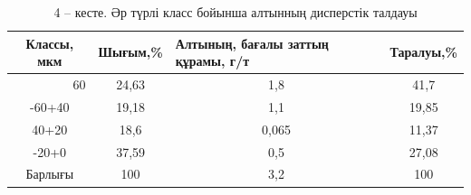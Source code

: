 
\begin{table}[H]
\caption*{4 -- кесте. Әр түрлі класс бойынша алтынның дисперстік талдауы}
\centering
\begin{tabular}{|c|c|c|c|}
\hline
Классы, мкм & \multicolumn{1}{l|}{Шығым,\%} & \multicolumn{1}{l|}{Алтының, бағалы заттың құрамы, г/т} & \multicolumn{1}{l|}{Таралуы,\%} \\ \hline
\multicolumn{1}{|r|}{60} & 24,63 & 1,8   & 41,7  \\ \hline
-60+40                   & 19,18 & 1,1   & 19,85 \\ \hline
40+20                    & 18,6  & 0,065 & 11,37 \\ \hline
-20+0                    & 37,59 & 0,5   & 27,08 \\ \hline
Барлығы                  & 100   & 3,2   & 100   \\ \hline
\end{tabular}%
\end{table}




